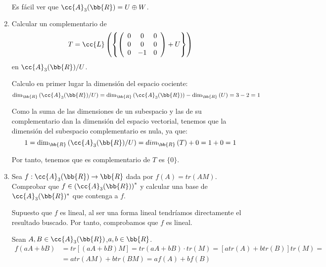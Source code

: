 \documentclass[12pt]{article}
\begin{document}
\begin{ejercicio}
\begin{enumerate}
        Es fácil ver que $\cc{A}_3(\bb{R}) = U\oplus W$.
        

        \item Calcular un complementario de
        \begin{equation*}
            T=\cc{L}\left(\left\{
                \left(\begin{array}{ccc}
                    0 & 0 & 0 \\
                    0 & 0 & 0 \\
                    0 & -1 & 0 \\
                \end{array}\right) + U
            \right\}\right)
        \end{equation*}
        en $\cc{A}_3(\bb{R})/U$.

        Calculo en primer lugar la dimensión del espacio cociente:
        \begin{equation*}
            \dim_{\bb{R}}\left(\cc{A}_3(\bb{R})/U\right) = 
            \dim_{\bb{R}}\left(\cc{A}_3(\bb{R})\right) - \dim_{\bb{R}}\left(U\right) = 3-2 = 1
        \end{equation*}

        Como la suma de las dimensiones de un subespacio y las de su complementario dan la dimensión del espacio vectorial, tenemos que la dimensión del subespacio complementario es nula, ya que:
        \begin{equation*}
            1 = \dim_{\bb{R}}\left(\cc{A}_3(\bb{R})/U\right) = dim_{\bb{R}}\left(T\right) + 0 = 1+0=1
        \end{equation*}

        Por tanto, tenemos que es complementario de $T$ es $\{0\}$.

        \item Sea $f:\cc{A}_3(\bb{R})\to \bb{R}$ dada por $f(A)=tr(AM)$. Comprobar que $f\in \left(\cc{A}_3(\bb{R})\right)^\ast$ y calcular una base de $\cc{A}_3(\bb{R})^\ast$ que contenga a $f$.

        Supuesto que $f$ es lineal, al ser una forma lineal tendríamos directamente el resultado buscado. Por tanto, comprobamos que $f$ es lineal.

        Sean $A,B\in \cc{A}_3(\bb{R})$,\qquad $a,b\in \bb{R}$.
        \begin{equation*}\begin{split}
            f(aA+bB) &= tr[(aA+bB)M] = tr(aA+bB)\cdot tr(M) = [atr(A) + btr(B)]tr(M) =\\
            &= atr(AM) + btr(BM) = af(A) + bf(B)
        \end{split}\end{equation*}


\end{enumerate}
\end{ejercicio}
\end{document}
